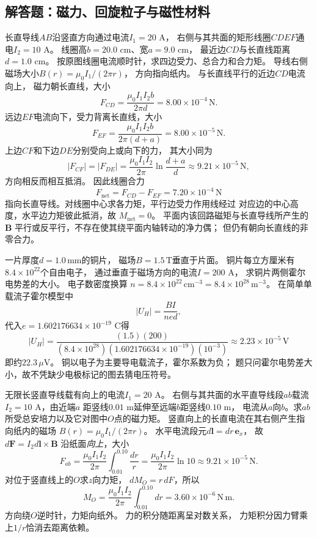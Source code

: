 \subsection{解答题：磁力、回旋粒子与磁性材料}

\problemtext 长直导线$AB$沿竖直方向通过电流$I_1=20$ A，
右侧与其共面的矩形线圈$CDEF$通电$I_2=10$ A。
线圈高$b=20.0$ cm、宽$a=9.0$ cm，
最近边$CD$与长直线距离$d=1.0$ cm。
按原图线圈电流顺时针，求四边受力、总合力和合力矩。
\workings
导线右侧磁场大小$B(r)=\mu_0I_1/(2\pi r)$，
方向指向纸内。
与长直线平行的近边$CD$电流向上，
磁力朝长直线，大小
\[
\boxed{F_{CD}=\frac{\mu_0I_1I_2b}{2\pi d}
=8.00\times10^{-4}\,\mathrm N}.
\]
远边$EF$电流向下，受力背离长直线，大小
\[
\boxed{F_{EF}=\frac{\mu_0I_1I_2b}{2\pi(d+a)}
=8.00\times10^{-5}\,\mathrm N}.
\]
上边$CF$和下边$DE$分别受向上或向下的力，
其大小同为
\[
\boxed{|F_{CF}|=|F_{DE}|=
\frac{\mu_0I_1I_2}{2\pi}
\ln\frac{d+a}{d}
\approx9.21\times10^{-5}\,\mathrm N},
\]
方向相反而相互抵消。
因此线圈合力
\[
\boxed{F_{\mathrm{net}}=F_{CD}-F_{EF}
=7.20\times10^{-4}\,\mathrm N}
\]
指向长直导线。对线圈中心求各力矩，平行边受力作用线经过
对应边的中心高度，水平边力矩彼此抵消，故
$\boxed{M_{\mathrm{net}}=0}$。
\crosscheck 平面内该回路磁矩与长直导线所产生的$\bm B$
平行或反平行，不存在使其绕平面内轴转动的净力偶；
但仍有朝向长直线的非零合力。

\problemtext 一片厚度$d=1.0\,\mathrm{mm}$的铜片，
磁场$B=1.5\,\mathrm T$垂直于片面。
铜片每立方厘米有$8.4\times10^{22}$个自由电子，
通过垂直于磁场方向的电流$I=200$ A，
求铜片两侧霍尔电势差的大小。
\workings
电子数密度换算
$n=8.4\times10^{22}\,\mathrm{cm^{-3}}
=8.4\times10^{28}\,\mathrm{m^{-3}}$。
在简单单载流子霍尔模型中
\[
|U_H|=\frac{BI}{n e d},
\]
代入$e=1.602176634\times10^{-19}$ C得
\[
\boxed{|U_H|=\frac{(1.5)(200)}
 {(8.4\times10^{28})(1.602176634\times10^{-19})(10^{-3})}
\approx2.23\times10^{-5}\,\mathrm V}
\]
即约$22.3\,\mu\mathrm V$。
\crosscheck 铜以电子为主要导电载流子，霍尔系数为负；
题只问霍尔电势差大小，故不凭缺少电极标记的图去猜电压符号。

\problemtext 无限长竖直导线载有向上的电流$I_1=20$ A。
右侧与其共面的水平直导线段$ab$载流$I_2=10$ A，由近端$a$
距竖线$0.01$ m延伸至远端$b$距竖线$0.10$ m，
电流从$a$向$b$。求$ab$所受总安培力以及它对图中$O$点的磁力矩。
\workings
竖直向上的长直电流在其右侧产生指向纸内的磁场
$B(r)=\mu_0I_1/(2\pi r)$。
水平电流段元$d\bm l=dr\,\bm e_x$，
故$d\bm F=I_2d\bm l\times\bm B$
沿纸面\emph{向上}，大小
\[
\boxed{F_{ab}=\frac{\mu_0I_1I_2}{2\pi}
\int_{0.01}^{0.10}\frac{dr}{r}
=\frac{\mu_0I_1I_2}{2\pi}\ln10
\approx9.21\times10^{-5}\,\mathrm N}.
\]
对位于竖直线上的$O$求$z$向力矩，
$dM_O=r\,dF$，所以
\[
\boxed{M_O=\frac{\mu_0I_1I_2}{2\pi}
\int_{0.01}^{0.10}dr
=3.60\times10^{-6}\,\mathrm{N\,m}}.
\]
方向绕$O$逆时针，力矩向纸外。
\crosscheck 力的积分随距离呈对数关系，
力矩积分因力臂乘上$1/r$恰消去距离依赖。

